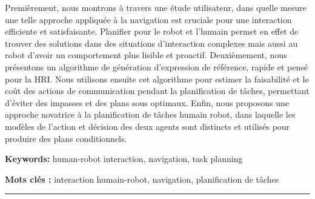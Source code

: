 \documentclass[english,a4paper,11pt,twoside]{StyleThese}
\begin{document}
\begin{vcenterpage}
Premièrement, nous montrons à travers une étude utilisateur, dans quelle mesure une telle approche appliquée à la navigation est cruciale pour une interaction efficiente et satisfaisante. Planifier pour le robot et l'humain permet en effet de trouver des solutions dans des situations d'interaction complexes mais aussi au robot d'avoir un comportement plus lisible et proactif. Deuxièmement, nous présentons un algorithme de génération d'expression de référence, rapide et pensé pour la HRI. Nous utilisons ensuite cet algorithme pour estimer la faisabilité et le coût des actions de communication pendant la planification de tâches, permettant d'éviter des impasses et des plans sous optimaux. Enfin, nous proposons une approche novatrice à la planification de tâches humain robot, dans laquelle les modèles de l'action et décision des deux agents sont distincts et utilisés pour produire des plans conditionnels.

\textbf{Keywords:} human-robot interaction, navigation, task planning

\textbf{Mots clés :} interaction humain-robot, navigation, planification de tâches
\\
\noindent\rule[2pt]{\textwidth}{0.5pt}
\end{vcenterpage}
\end{document}
